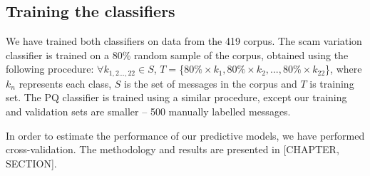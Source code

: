 \begin{table}[h]
  \centering
   \caption{Feature selection: scam variation classifier vs. PQ classifier}
\end{table}

\subsection{Training the classifiers}

We have trained both classifiers on data from the 419 corpus.  The scam variation classifier is trained on a 80\% random sample of the corpus, obtained using the following procedure: $\forall k_{1,2...,22} \in S$, $T=$\{$80\% \times k_{1}, 80\% \times k_{2},..., 80\% \times k_{22}$\}, where $k_{n}$ represents each class, $S$ is the set of messages in the corpus and $T$ is training set. The PQ classifier is trained using a similar procedure, except our training and validation sets are smaller -- 500 manually labelled messages.

In order to estimate the performance of our predictive models, we have performed cross-validation. The methodology and results are presented in [CHAPTER, SECTION].